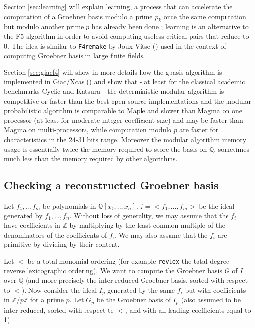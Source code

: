 \documentclass[a4paper,11pt]{article}
\newcommand{\Z}{{\mathbb{Z}}}
\newcommand{\Q}{{\mathbb{Q}}}
\begin{document}
\begin{giacjshere}
Section \ref{sec:learning}
 will explain learning, a process that can accelerate the
computation of a Groebner basis modulo a prime $p_k$ once the
same computation but modulo another prime $p$ has already been
done ; learning is an alternative to the F5 algorithm
in order to avoid computing useless critical pairs that reduce to 0. The
idea is similar to {\tt F4remake} by Joux-Vitse (\cite{joux2011variant}) 
used in the context of computing Groebner basis in large finite fields.

Section \ref{sec:giacf4} 
will show in more details how the gbasis algorithm is implemented
in Giac/Xcas (\cite{giac}) and show that - at least for the classical academic
benchmarks Cyclic and Katsura - the deterministic modular algorithm
is competitive or faster than the best open-source implementations
and the modular probabilistic algorithm is comparable to Maple
and slower than Magma on one processor (at least for moderate integer coefficient
size) and may be faster than Magma on multi-processors, 
while computation modulo $p$ are faster for characteristics in the
24-31 bits range.
Moreover the modular algorithm memory usage is essentially
twice the memory required to store the basis on $\Q$, sometimes
much less than the memory required by other algorithms.

\subsection{Checking a reconstructed Groebner basis} \label{sec:probagb}
Let $f_1,..,f_m$ be polynomials in $\Q[x_1,..,x_n]$, $I=<f_1,...,f_m>$
be the ideal generated by $f_1,...,f_n$. Without loss of generality, we may
assume that the $f_i$ have coefficients in $\Z$ by multiplying
by the least common multiple of the denominators of the coefficients
of $f_i$. We may also assume that the $f_i$ are primitive by dividing
by their content.

Let $<$ be a total monomial ordering (for example {\tt revlex} the
total degree reverse lexicographic ordering). We want to compute
the Groebner basis $G$ of $I$ over $\Q$ (and more precisely
the inter-reduced Groebner basis, sorted with respect to $<$).
Now consider the ideal $I_p$ generated by the same $f_i$ but with
coefficients in $\Z/p\Z$ for a prime $p$. Let $G_p$ be the Groebner basis of $I_p$
(also assumed to be inter-reduced, sorted with respect to $<$, and with
all leading coefficients equal to 1).


\end{giacjshere}
\end{document}
